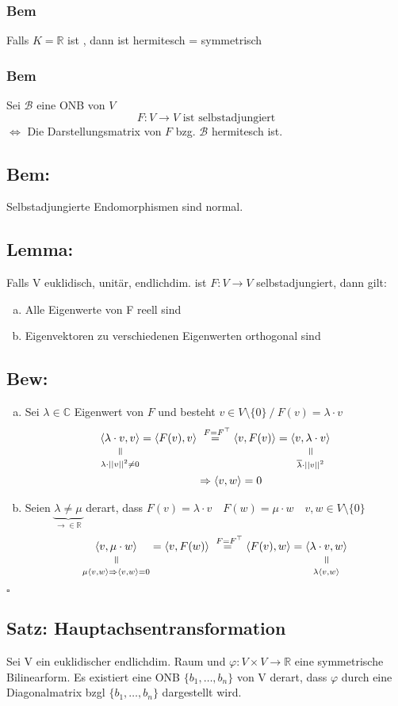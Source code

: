 \documentclass[titlepage,12pt,a4paper,ngerman]{report}
\newenvironment{bew}[1]{\subsection{Bew: #1}}{\hfill$\square$}
\newcommand{\Bew}[2]{\begin{bew}{#1}#2\end{bew}}
\newcommand{\verteq}{\rotatebox{90}{$\,=$}}
\newcommand{\equalto}[2]{\underset{\scriptstyle\overset{\mkern4mu\verteq}{#2}}{#1}}
\newcommand{\tx}[1]{\textrm{#1}}
\newcommand{\basis}[3]{\{#1_{#2}, \dots, #1_{#3}\}}
\newcommand{\ska}[2]{\langle #1 , #2 \rangle}
\begin{document}
\subsubsection{Bem}
Falls $K = \mathbb R$ ist , dann ist hermitesch = symmetrisch
\subsubsection{Bem}
Sei $\mathcal B$ eine ONB von $V$
$$F: V \to V \tx{ ist selbstadjungiert}$$
$\Leftrightarrow$ Die Darstellungsmatrix von $F$ bzg. $\mathcal B$ hermitesch ist.

\subsection{Bem:}
Selbstadjungierte Endomorphismen sind normal.
\subsection{Lemma:}
Falls V euklidisch, unitär, endlichdim. ist $ F: V\to V $ selbstadjungiert, dann gilt:
\begin{enumerate}[a)]
	\item Alle Eigenwerte von F reell sind
	\item Eigenvektoren zu verschiedenen Eigenwerten orthogonal sind
\end{enumerate}

\Bew{}{
\begin{enumerate}[a)]
	\item Sei $\lambda \in \mathbb C$ Eigenwert von $F$ und besteht $v \in V \setminus \{0\}\ / \ F(v) = \lambda \cdot v$
	\begin{align*}
 		\equalto{\ska{\lambda \cdot v}{v}}{\lambda \cdot ||v||^2 \neq 0} = \ska{F(v)}{v}& \buildrel{\ F = F^\top} \over = \ska{v}{F(v)} = \equalto{\ska{v}{\lambda \cdot v}}{\overline{\lambda} \cdot ||v||^2}\\
 		&\Rightarrow \ska{v}{w} = 0
	\end{align*}
	\item Seien $\underbrace{\lambda \neq \mu}_{\rightarrow \in \mathbb R}$ derart, dass $F(v) = \lambda \cdot v \quad F(w) = \mu \cdot w \quad v,w \in V \setminus \{0\}$
	$$\equalto{\ska{v}{\mu \cdot w}}{\mu \ska{v}{w} \Rightarrow \ska{v}{w} = 0} = \ska{v}{F(w)} \buildrel{\ F = F^\top} \over = \ska{F(v)}{w}= \equalto{\ska{\lambda \cdot v}{w}}{\lambda \ska{v}{w}}$$
\end{enumerate}}

\subsection{Satz: Hauptachsentransformation}
Sei V ein euklidischer endlichdim. Raum und $ \varphi: V \times V \to \mathbb{R} $ eine symmetrische Bilinearform. Es existiert eine ONB  $ \basis{b}{1}{n} $ von V derart, dass $ \varphi $ durch eine Diagonalmatrix bzgl $ \basis{b}{1}{n} $ dargestellt wird.
\end{document}
